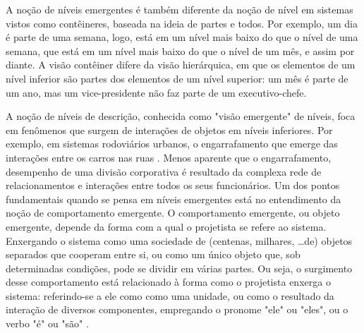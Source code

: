     \begin{figure}[h!]
        \centering
    \end{figure}
     
    A noção de níveis emergentes é também diferente da noção de nível em sistemas vistos como contêineres, baseada na ideia de partes e todos. Por exemplo, um dia é parte de uma semana, logo, está em um nível mais baixo do que o nível de uma semana, que está em um nível mais baixo do que o nível de um mês, e assim por diante. A visão contêiner difere da visão hierárquica, em que os elementos de um nível inferior são partes dos elementos de um nível superior: um mês é parte de um ano, mas um vice-presidente não faz parte de um executivo-chefe. 
    
    A noção de níveis de descrição, conhecida como "visão emergente" de níveis, foca em fenômenos que surgem de interações de objetos em níveis inferiores. Por exemplo, em sistemas rodoviários urbanos, o engarrafamento que emerge das interações entre os carros nas ruas \cite{wilensky1999thinking}. Menos aparente que o engarrafamento, desempenho de uma divisão corporativa é resultado da complexa rede de relacionamentos e interações entre todos os seus funcionários.   
    Um dos pontos fundamentais quando se pensa em níveis emergentes está no entendimento da noção de comportamento emergente. %
    O comportamento emergente, ou objeto emergente, depende da forma com a qual o projetista se refere ao sistema. Enxergando o sistema como uma sociedade de (centenas, milhares, \ldots de) objetos separados que cooperam entre si, ou como um único objeto que, sob determinadas condições, pode se dividir em várias partes. Ou seja, o surgimento desse comportamento está relacionado à forma como o projetista enxerga o sistema: referindo-se a ele como como uma unidade, ou como o resultado da interação de diversos componentes, empregando o pronome "ele" ou "eles", ou o verbo "é" ou "são" \cite{wilensky1999thinking}.
    

